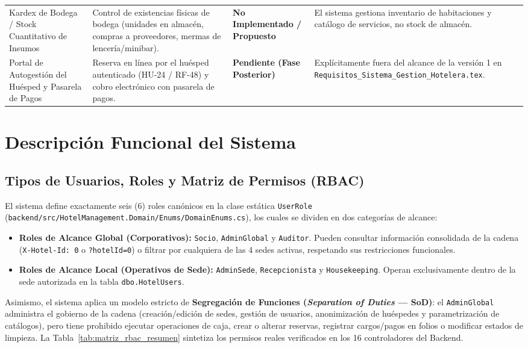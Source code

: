 \documentclass[12pt,a4paper]{article}
\begin{document}
\begin{longtable}{p{3.4cm} p{5.8cm} p{2.3cm} p{3.1cm}}
Kardex de Bodega / Stock Cuantitativo de Insumos & Control de existencias f\'isicas de bodega (unidades en almac\'en, compras a proveedores, mermas de lencer\'ia/minibar). & \textbf{No Implementado / Propuesto} & El sistema gestiona inventario de habitaciones y cat\'alogo de servicios, no stock de almac\'en.\\[0.15cm]
Portal de Autogesti\'on del Hu\'esped y Pasarela de Pagos & Reserva en l\'inea por el hu\'esped autenticado (HU-24 / RF-48) y cobro electr\'onico con pasarela de pagos. & \textbf{Pendiente (Fase Posterior)} & Expl\'icitamente fuera del alcance de la versi\'on 1 en \texttt{Requisitos\_Sistema\_Gestion\_Hotelera.tex}.\\
\end{longtable}

\section{Descripci\'on Funcional del Sistema}

\subsection{Tipos de Usuarios, Roles y Matriz de Permisos (RBAC)}
El sistema define exactamente seis (6) roles can\'onicos en la clase est\'atica \texttt{UserRole} (\texttt{backend/src/HotelManagement.Domain/Enums/DomainEnums.cs}), los cuales se dividen en dos categor\'ias de alcance:
\begin{itemize}
    \item \textbf{Roles de Alcance Global (Corporativos):} \texttt{Socio}, \texttt{AdminGlobal} y \texttt{Auditor}. Pueden consultar informaci\'on consolidada de la cadena (\texttt{X-Hotel-Id: 0} o \texttt{?hotelId=0}) o filtrar por cualquiera de las 4 sedes activas, respetando sus restricciones funcionales.
    \item \textbf{Roles de Alcance Local (Operativos de Sede):} \texttt{AdminSede}, \texttt{Recepcionista} y \texttt{Housekeeping}. Operan exclusivamente dentro de la sede autorizada en la tabla \texttt{dbo.HotelUsers}.
\end{itemize}

Asimismo, el sistema aplica un modelo estricto de \textbf{Segregaci\'on de Funciones (\textit{Separation of Duties} --- SoD)}: el \texttt{AdminGlobal} administra el gobierno de la cadena (creaci\'on/edici\'on de sedes, gesti\'on de usuarios, anonimizaci\'on de hu\'espedes y parametrizaci\'on de cat\'alogos), pero tiene prohibido ejecutar operaciones de caja, crear o alterar reservas, registrar cargos/pagos en folios o modificar estados de limpieza. La Tabla~\ref{tab:matriz_rbac_resumen} sintetiza los permisos reales verificados en los 16 controladores del Backend.
\end{document}
